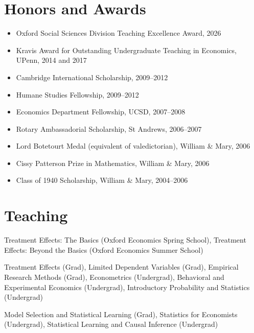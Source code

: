 \documentclass[line,overlapped]{myres}
\begin{document}
\begin{resume}


\section{\sc Honors and Awards}
\vspace{1em}
\begin{itemize}
\item Oxford Social Sciences Division Teaching Excellence Award, 2026
\item Kravis Award for Outstanding Undergraduate Teaching in Economics, UPenn, 2014 and 2017
\item Cambridge International Scholarship, 2009--2012
\item Humane Studies Fellowship, 2009--2012
\item Economics Department Fellowship, UCSD, 2007--2008
\item Rotary Ambassadorial Scholarship, St Andrews, 2006--2007
\item Lord Botetourt Medal (equivalent of valedictorian), William \& Mary, 2006
\item Cissy Patterson Prize in Mathematics, William \& Mary, 2006
\item Class of 1940 Scholarship, William \& Mary, 2004--2006
\end{itemize}

\section{\sc Teaching }
\begin{description}[style=multiline,leftmargin=3cm,font=\normalfont]
  \item[Short Courses:] Treatment Effects: The Basics (Oxford Economics Spring School), Treatment Effects: Beyond the Basics (Oxford Economics Summer School)
  \item[Oxford:] Treatment Effects (Grad), Limited Dependent Variables (Grad), Empirical Research Methods (Grad), Econometrics (Undergrad), Behavioral and Experimental Economics (Undergrad), Introductory Probability and Statistics (Undergrad)
  \item[UPenn:] Model Selection and Statistical Learning (Grad), Statistics for Economists (Undergrad), Statistical Learning and Causal Inference (Undergrad)
\end{description}


\end{resume}
\end{document}

